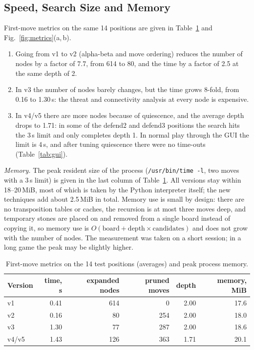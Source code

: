 \documentclass[a4paper,10pt,twocolumn]{article}
\newenvironment{points}{\begin{enumerate}[label=(\arabic*),leftmargin=*,itemsep=2pt,topsep=3pt]}{\end{enumerate}}
\newcommand{\code}[1]{\texttt{#1}}
\begin{document}
\subsection{Speed, Search Size and Memory}\label{sec:speed}
First-move metrics on the same 14 positions are given in Table~\ref{tab:metrics} and Fig.~\ref{fig:metrics}(a,\,b).
\begin{points}
\item Going from v1 to v2 (alpha-beta and move ordering) reduces the number of nodes by a factor of 7.7, from 614 to 80, and the time by a factor of 2.5 at the same depth of 2.
\item In v3 the number of nodes barely changes, but the time grows 8-fold, from 0.16 to 1.30\,s: the threat and connectivity analysis at every node is expensive.
\item In v4/v5 there are more nodes because of quiescence, and the average depth drops to 1.71: in some of the defend2 and defend3 positions the search hits the 3\,s limit and only completes depth 1. In normal play through the GUI the limit is 4\,s, and after tuning quiescence there were no time-outs (Table~\ref{tab:gui}).
\end{points}

\emph{Memory.} The peak resident size of the process (\code{/usr/bin/time -l}, two moves with a 3\,s limit) is given in the last column of Table~\ref{tab:metrics}. All versions stay within 18--20\,MiB, most of which is taken by the Python interpreter itself; the new techniques add about 2.5\,MiB in total. Memory use is small by design: there are no transposition tables or caches, the recursion is at most three moves deep, and temporary stones are placed on and removed from a single board instead of copying it, so memory use is $O(\text{board}+\text{depth}\times\text{candidates})$ and does not grow with the number of nodes. The measurement was taken on a short session; in a long game the peak may be slightly higher.

\begin{table}[t]
\centering
\caption{First-move metrics on the 14 test positions (averages) and peak process memory.}
\label{tab:metrics}
\begin{tabular}{@{}lrrrrr@{}}
\toprule
Version & time, s & expanded nodes & pruned moves & depth & memory, MiB \\
\midrule
v1 & 0.41 & 614 & 0 & 2.00 & 17.6 \\
v2 & 0.16 & 80 & 254 & 2.00 & 18.0 \\
v3 & 1.30 & 77 & 287 & 2.00 & 18.6 \\
v4/v5 & 1.43 & 126 & 363 & 1.71 & 20.1 \\
\bottomrule
\end{tabular}
\end{table}
\end{document}
